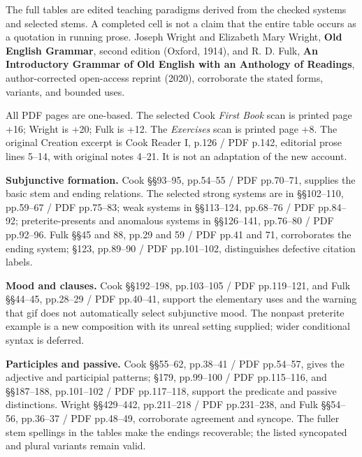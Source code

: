 The full tables are edited teaching paradigms derived from the checked systems and selected stems. A completed cell is not a claim that the entire table occurs as a quotation in running prose. Joseph Wright and Elizabeth Mary Wright, \textbf{Old English Grammar}, second edition (Oxford, 1914), and R. D. Fulk, \textbf{An Introductory Grammar of Old English with an Anthology of Readings}, author-corrected open-access reprint (2020), corroborate the stated forms, variants, and bounded uses.

All PDF pages are one-based. The selected Cook \emph{First Book} scan is printed page +16; Wright is +20; Fulk is +12. The \emph{Exercises} scan is printed page +8. The original Creation excerpt is Cook Reader I, p.126 /\allowbreak{} PDF p.142, editorial prose lines 5–14, with original notes 4–21. It is not an adaptation of the new account.

\textbf{Subjunctive formation.} Cook §§93–95, pp.54–55 /\allowbreak{} PDF pp.70–71, supplies the basic stem and ending relations. The selected strong systems are in §§102–110, pp.59–67 /\allowbreak{} PDF pp.75–83; weak systems in §§113–124, pp.68–76 /\allowbreak{} PDF pp.84–92; preterite-presents and anomalous systems in §§126–141, pp.76–80 /\allowbreak{} PDF pp.92–96. Fulk §§45 and 88, pp.29 and 59 /\allowbreak{} PDF pp.41 and 71, corroborates the ending system; §123, pp.89–90 /\allowbreak{} PDF pp.101–102, distinguishes defective citation labels.

\textbf{Mood and clauses.} Cook §§192–198, pp.103–105 /\allowbreak{} PDF pp.119–121, and Fulk §§44–45, pp.28–29 /\allowbreak{} PDF pp.40–41, support the elementary uses and the warning that gif does not automatically select subjunctive mood. The nonpast preterite example is a new composition with its unreal setting supplied; wider conditional syntax is deferred.

\textbf{Participles and passive.} Cook §§55–62, pp.38–41 /\allowbreak{} PDF pp.54–57, gives the adjective and participial patterns; §179, pp.99–100 /\allowbreak{} PDF pp.115–116, and §§187–188, pp.101–102 /\allowbreak{} PDF pp.117–118, support the predicate and passive distinctions. Wright §§429–442, pp.211–218 /\allowbreak{} PDF pp.231–238, and Fulk §§54–56, pp.36–37 /\allowbreak{} PDF pp.48–49, corroborate agreement and syncope. The fuller stem spellings in the tables make the endings recoverable; the listed syncopated and plural variants remain valid.

